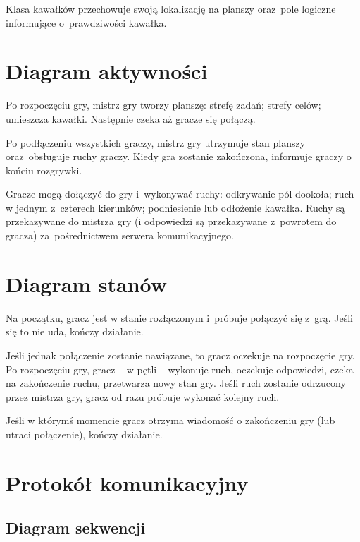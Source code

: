 \documentclass[a4paper]{article}
\begin{document}
Klasa kawałków przechowuje swoją lokalizację na planszy oraz~pole logiczne informujące o~prawdziwości kawałka.

\newpage
\section{Diagram aktywności}

Po rozpoczęciu gry, mistrz gry tworzy planszę: strefę zadań; strefy celów; umieszcza kawałki.
Następnie czeka aż gracze się połączą.

Po podłączeniu wszystkich graczy, mistrz gry utrzymuje stan planszy oraz~obsługuje ruchy graczy.
Kiedy gra zostanie zakończona, informuje graczy o końciu rozgrywki.

Gracze mogą dołączyć do gry i~wykonywać ruchy: odkrywanie pól dookoła; ruch w jednym z~czterech kierunków; podniesienie lub odłożenie kawałka.
Ruchy są przekazywane do mistrza gry (i odpowiedzi są przekazywane z~powrotem do gracza) za~pośrednictwem serwera komunikacyjnego.

\newpage
\section{Diagram stanów}


Na początku, gracz jest w stanie rozłączonym i~próbuje połączyć się z~grą.
Jeśli się to nie uda, kończy działanie.

Jeśli jednak połączenie zostanie nawiązane, to gracz oczekuje na rozpoczęcie gry.
Po rozpoczęciu gry, gracz -- w pętli -- wykonuje ruch, oczekuje odpowiedzi, czeka na zakończenie ruchu, przetwarza nowy stan gry.
Jeśli ruch zostanie odrzucony przez mistrza gry, gracz od razu próbuje wykonać kolejny ruch.

Jeśli w którymś momencie gracz otrzyma wiadomość o zakończeniu gry (lub utraci połączenie), kończy działanie.

\section{Protokół komunikacyjny}


\subsection{Diagram sekwencji}

\end{document}
